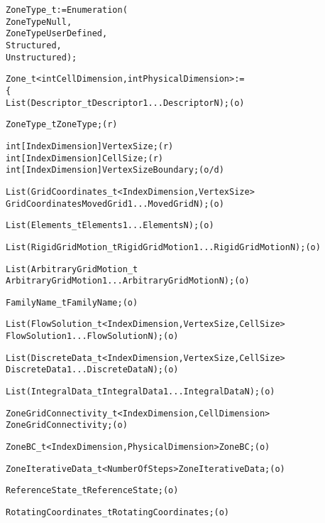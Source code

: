 \begin{alltt}	
  ZoneType\_t := Enumeration(
    ZoneTypeNull,
    ZoneTypeUserDefined,
    Structured,
    Unstructured ) ;

  Zone_t< int CellDimension, int PhysicalDimension > :=
    \{
    List( Descriptor_t Descriptor1 ... DescriptorN ) ;                      (o)

    ZoneType_t ZoneType ;                                                   (r)

    int[IndexDimension] VertexSize ;                                        (r)
    int[IndexDimension] CellSize ;                                          (r)
    int[IndexDimension] VertexSizeBoundary ;                                (o/d)

    List( GridCoordinates_t<IndexDimension, VertexSize>
          GridCoordinates MovedGrid1 ... MovedGridN ) ;                     (o)

    List( Elements_t Elements1 ... ElementsN ) ;                            (o)

    List( RigidGridMotion_t RigidGridMotion1 ... RigidGridMotionN ) ;       (o)

    List( ArbitraryGridMotion_t
          ArbitraryGridMotion1 ... ArbitraryGridMotionN ) ;                 (o)

    FamilyName_t FamilyName ;                                               (o)

    List( FlowSolution_t<IndexDimension, VertexSize, CellSize> 
          FlowSolution1 ... FlowSolutionN ) ;                               (o)

    List( DiscreteData_t<IndexDimension, VertexSize, CellSize> 
          DiscreteData1 ... DiscreteDataN ) ;                               (o)

    List( IntegralData_t IntegralData1 ... IntegralDataN ) ;                (o)

    ZoneGridConnectivity_t<IndexDimension, CellDimension>
       ZoneGridConnectivity ;                                               (o)

    ZoneBC_t<IndexDimension, PhysicalDimension> ZoneBC ;                    (o)

    ZoneIterativeData_t<NumberOfSteps> ZoneIterativeData ;                  (o)

    ReferenceState_t ReferenceState ;                                       (o)

    RotatingCoordinates\_t RotatingCoordinates ;                             (o)


\end{alltt}
